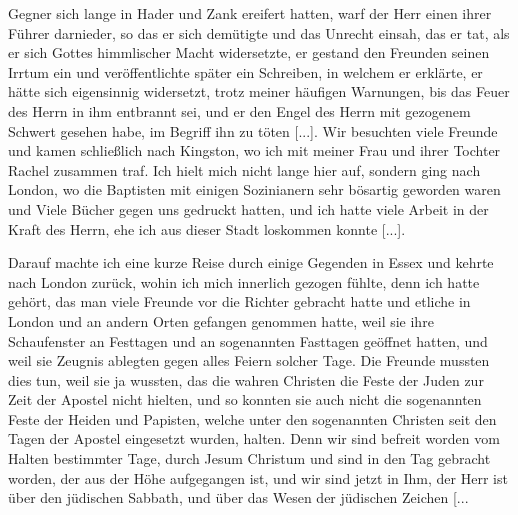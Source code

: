Gegner sich lange in Hader und Zank ereifert hatten, warf der
Herr einen ihrer Führer darnieder, so das er sich demütigte und
das Unrecht einsah, das er tat, als er sich Gottes himmlischer
Macht widersetzte, er gestand den Freunden seinen Irrtum ein
und veröffentlichte später ein Schreiben, in welchem er erklärte,
er hätte sich eigensinnig widersetzt, trotz meiner häufigen 
Warnungen, bis das Feuer des Herrn in ihm entbrannt sei, und er
den Engel des Herrn mit gezogenem Schwert gesehen habe, im
Begriff ihn zu töten [...]. Wir besuchten viele Freunde und
kamen schließlich nach Kingston, wo ich mit 
meiner Frau und
ihrer Tochter Rachel zusammen traf. 
Ich hielt mich nicht lange
hier auf, sondern ging nach London, wo die Baptisten mit einigen
Sozinianern sehr bösartig geworden waren und Viele Bücher gegen
uns gedruckt hatten, und ich hatte viele Arbeit in der Kraft des
Herrn, ehe ich aus dieser Stadt loskommen konnte [...].

Darauf machte ich eine kurze Reise durch einige Gegenden
in Essex und kehrte nach London 
zurück, wohin ich mich innerlich
gezogen fühlte, denn ich hatte gehört, das man viele Freunde
vor die Richter gebracht hatte und etliche in London und an andern
Orten gefangen genommen hatte, weil sie ihre Schaufenster an
Festtagen und an sogenannten 
Fasttagen geöffnet hatten, und
weil sie Zeugnis ablegten gegen alles Feiern solcher Tage. Die
Freunde mussten dies tun, weil sie ja wussten, das die wahren
Christen die Feste der Juden zur Zeit der Apostel nicht hielten,
und so konnten sie auch nicht die sogenannten Feste der Heiden
und Papisten, welche unter den sogenannten Christen seit den
Tagen der Apostel eingesetzt wurden, halten. Denn wir sind 
befreit worden vom Halten bestimmter Tage, durch Jesum Christum
und sind in den Tag gebracht worden, der aus der Höhe aufgegangen 
ist, und wir sind jetzt in Ihm, der Herr ist über den
jüdischen Sabbath, und über das Wesen 
der jüdischen Zeichen [...

